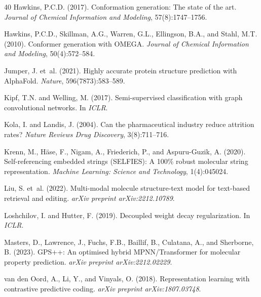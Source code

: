 \documentclass[11pt]{article}
\begin{document}
\begin{thebibliography}{40}
Hawkins, P.C.D. (2017).
\newblock Conformation generation: The state of the art.
\newblock \emph{Journal of Chemical Information and Modeling}, 57(8):1747--1756.

Hawkins, P.C.D., Skillman, A.G., Warren, G.L., Ellingson, B.A., and Stahl, M.T. (2010).
\newblock Conformer generation with OMEGA.
\newblock \emph{Journal of Chemical Information and Modeling}, 50(4):572--584.

Jumper, J. et~al. (2021).
\newblock Highly accurate protein structure prediction with AlphaFold.
\newblock \emph{Nature}, 596(7873):583--589.

Kipf, T.N. and Welling, M. (2017).
\newblock Semi-supervised classification with graph convolutional networks.
\newblock In \emph{ICLR}.

Kola, I. and Landis, J. (2004).
\newblock Can the pharmaceutical industry reduce attrition rates?
\newblock \emph{Nature Reviews Drug Discovery}, 3(8):711--716.

Krenn, M., H{\"a}se, F., Nigam, A., Friederich, P., and Aspuru-Guzik, A. (2020).
\newblock Self-referencing embedded strings (SELFIES): A 100\% robust molecular string representation.
\newblock \emph{Machine Learning: Science and Technology}, 1(4):045024.

Liu, S. et~al. (2022).
\newblock Multi-modal molecule structure-text model for text-based retrieval and editing.
\newblock \emph{arXiv preprint arXiv:2212.10789}.

Loshchilov, I. and Hutter, F. (2019).
\newblock Decoupled weight decay regularization.
\newblock In \emph{ICLR}.

Masters, D., Lawrence, J., Fuchs, F.B., Baillif, B., Culatana, A., and Sherborne, B. (2023).
\newblock GPS++: An optimised hybrid MPNN/Transformer for molecular property prediction.
\newblock \emph{arXiv preprint arXiv:2212.02229}.

van den Oord, A., Li, Y., and Vinyals, O. (2018).
\newblock Representation learning with contrastive predictive coding.
\newblock \emph{arXiv preprint arXiv:1807.03748}.


\end{thebibliography}
\end{document}
